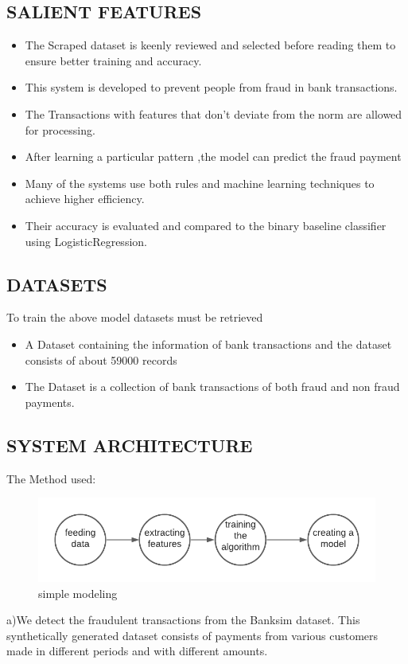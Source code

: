 \documentclass[12pt]{article}
\begin{document}
\subsection{SALIENT FEATURES}
\begin{itemize}
  \item The Scraped dataset is keenly reviewed and selected before reading them to ensure better training and accuracy.
    \item This system is developed to prevent people from fraud in bank transactions.
    \item The Transactions with features that don’t deviate from the norm are allowed for processing.  
    \item After learning a particular pattern ,the model can predict the fraud payment
    \item Many of the systems use both rules and machine learning techniques to achieve higher efficiency.
    \item Their accuracy is evaluated and compared to the binary baseline classifier using LogisticRegression.

\end{itemize}
\subsection{DATASETS}
To train the above model datasets must be retrieved 
\begin{itemize}
    \item A Dataset containing the information of bank transactions	and the dataset consists of about  59000 records
    \item The Dataset is a collection of bank transactions of both fraud and non fraud payments.
\end{itemize}
\subsection{SYSTEM ARCHITECTURE}
        The Method used:
        \begin{figure}[htp]
            \centering
            \includegraphics[width=5in]{bb.png}
            \caption{simple modeling}
            \label{fig:galaxy}
        \end{figure}
        \item a)We detect the fraudulent transactions from the Banksim dataset. This synthetically generated dataset consists of payments from various customers made in different periods and with different amounts.
        \pagebreak
        
\end{document}

